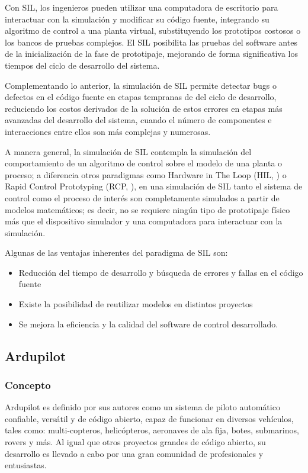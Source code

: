 Con SIL, los ingenieros pueden utilizar una computadora de escritorio para interactuar con la simulación y modificar su código fuente, integrando su algoritmo de control a una planta virtual, substituyendo los prototipos costosos o los bancos de pruebas complejos. El SIL posibilita las pruebas del software antes de la inicialización de la fase de prototipaje, mejorando de forma significativa los tiempos del ciclo de desarrollo del sistema. 

Complementando lo anterior, la simulación de SIL permite detectar bugs o defectos en el código fuente en etapas tempranas de del ciclo de desarrollo, reduciendo los costos derivados de la solución de estos errores en etapas más avanzadas del desarrollo del sistema, cuando el número de componentes e interacciones entre ellos son más complejas y numerosas. 

A manera general, la simulación de SIL contempla la simulación del comportamiento de un algoritmo de control sobre el modelo de una planta o proceso; a diferencia otros paradigmas como Hardware in The Loop (HIL, \citet{HIL_OPAL})  o Rapid Control Prototyping (RCP, \citet{RCP_OPAL}), en una simulación de SIL tanto el sistema de control como el proceso de interés son completamente simulados a partir de modelos matemáticos; es decir, no se requiere ningún tipo de prototipaje físico más que el dispositivo simulador y una computadora para interactuar con la simulación.


Algunas de las ventajas inherentes del paradigma de SIL son: 

\begin{itemize}
    \item Reducción del tiempo de desarrollo y búsqueda de errores y fallas en el código fuente 
    \item Existe la posibilidad de reutilizar modelos en distintos proyectos 
    \item Se mejora la eficiencia y la calidad del software de control desarrollado. 
\end{itemize}


\subsection{Ardupilot}

\subsubsection{Concepto}
Ardupilot es definido por sus autores \cite{ArduPilot} como un sistema de piloto automático confiable, versátil y de código abierto, capaz de funcionar en diversos vehículos, tales como: multi-copteros, helicópteros, aeronaves de ala fija, botes, submarinos, rovers y más. Al igual que otros proyectos grandes de código abierto, su desarrollo es llevado a cabo por una gran comunidad de profesionales y entusiastas.  

